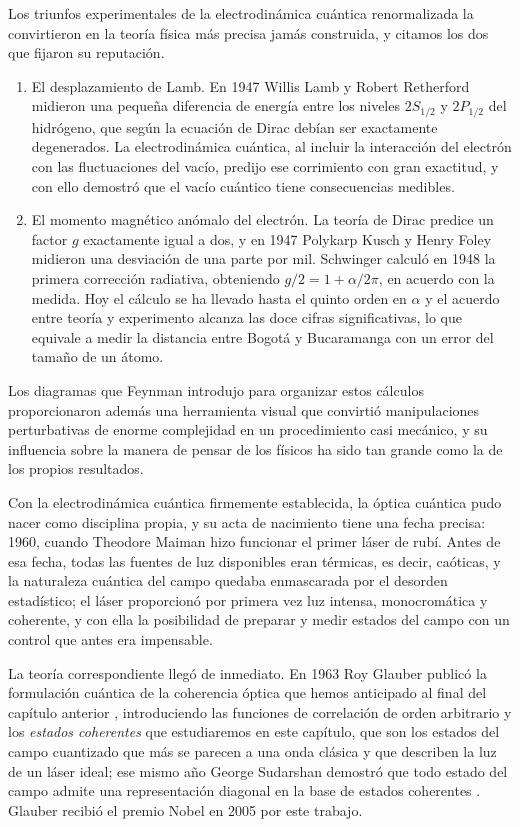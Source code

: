     Los triunfos experimentales de la electrodinámica cuántica renormalizada la convirtieron en la teoría física más precisa jamás construida, y citamos los dos que fijaron su reputación.

    \begin{enumerate}
        \item El desplazamiento de Lamb. En 1947 Willis Lamb y Robert Retherford midieron una pequeña diferencia de energía entre los niveles $2S_{1/2}$ y $2P_{1/2}$ del hidrógeno, que según la ecuación de Dirac debían ser exactamente degenerados. La electrodinámica cuántica, al incluir la interacción del electrón con las fluctuaciones del vacío, predijo ese corrimiento con gran exactitud, y con ello demostró que el vacío cuántico tiene consecuencias medibles.

        \item El momento magnético anómalo del electrón. La teoría de Dirac predice un factor $g$ exactamente igual a dos, y en 1947 Polykarp Kusch y Henry Foley midieron una desviación de una parte por mil. Schwinger calculó en 1948 la primera corrección radiativa, obteniendo $g/2 = 1 + \alpha/2\pi$, en acuerdo con la medida. Hoy el cálculo se ha llevado hasta el quinto orden en $\alpha$ y el acuerdo entre teoría y experimento alcanza las doce cifras significativas, lo que equivale a medir la distancia entre Bogotá y Bucaramanga con un error del tamaño de un átomo.
    \end{enumerate}

    Los diagramas que Feynman introdujo para organizar estos cálculos proporcionaron además una herramienta visual que convirtió manipulaciones perturbativas de enorme complejidad en un procedimiento casi mecánico, y su influencia sobre la manera de pensar de los físicos ha sido tan grande como la de los propios resultados.

    Con la electrodinámica cuántica firmemente establecida, la óptica cuántica pudo nacer como disciplina propia, y su acta de nacimiento tiene una fecha precisa: 1960, cuando Theodore Maiman hizo funcionar el primer láser de rubí. Antes de esa fecha, todas las fuentes de luz disponibles eran térmicas, es decir, caóticas, y la naturaleza cuántica del campo quedaba enmascarada por el desorden estadístico; el láser proporcionó por primera vez luz intensa, monocromática y coherente, y con ella la posibilidad de preparar y medir estados del campo con un control que antes era impensable.

    La teoría correspondiente llegó de inmediato. En 1963 Roy Glauber publicó la formulación cuántica de la coherencia óptica que hemos anticipado al final del capítulo anterior \citep{glauber1963quantum}, introduciendo las funciones de correlación de orden arbitrario y los \textit{estados coherentes} que estudiaremos en este capítulo, que son los estados del campo cuantizado que más se parecen a una onda clásica y que describen la luz de un láser ideal; ese mismo año George Sudarshan demostró que todo estado del campo admite una representación diagonal en la base de estados coherentes \citep{sudarshan1963equivalence}. Glauber recibió el premio Nobel en 2005 por este trabajo.

